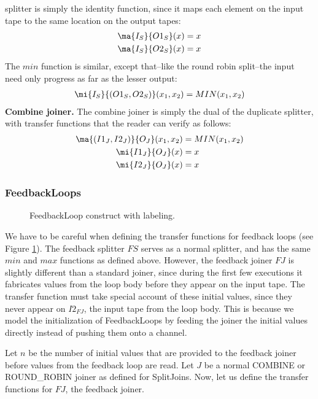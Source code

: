 splitter is simply the identity function, since it maps each element
on the input tape to the same location on the output tapes:
\begin{align*}
\ma{I_S}{O1_S}(x) &= x \\
\ma{I_S}{O2_S}(x) &= x
\end{align*}
The $min$ function is similar, except that--like the round robin
split--the input need only progress as far as the lesser output:
\begin{align*}
\mi{I_S}{(O1_S, O2_S)}(x_1, x_2) = MIN(x_1, x_2)
\end{align*}
{\bf Combine joiner.} The combine joiner is simply the dual of the
duplicate splitter, with transfer functions that the reader can verify
as follows:
\begin{align*}
\ma{(I1_J, I2_J)}{O_J}(x_1, x_2) &= MIN(x_1, x_2) \\
\mi{I1_J}{O_J}(x) &= x \\
\mi{I2_J}{O_J}(x) &= x
\end{align*}

\subsubsection{FeedbackLoops}

\begin{figure}
\centering
{}
\caption{\protect\small  FeedbackLoop construct with labeling.
\protect\label{looplabel}}
\end{figure}

We have to be careful when defining the transfer functions for
feedback loops (see Figure \ref{looplabel}).  The feedback splitter
$FS$ serves as a normal splitter, and has the same $min$ and $max$
functions as defined above.  However, the feedback joiner $FJ$ is
slightly different than a standard joiner, since during the first few
executions it fabricates values from the loop body before they appear
on the input tape.  The transfer function must take special account of
these initial values, since they never appear on $I2_{FJ}$, the input
tape from the loop body.  This is because we model the initialization
of FeedbackLoops by feeding the joiner the initial values directly
instead of pushing them onto a channel.

Let $n$ be the number of initial values that are provided to the
feedback joiner before values from the feedback loop are read.  Let
$J$ be a normal COMBINE or ROUND\_ROBIN joiner as defined for
SplitJoins.  Now, let us define the transfer functions for $FJ$, the
feedback joiner.


